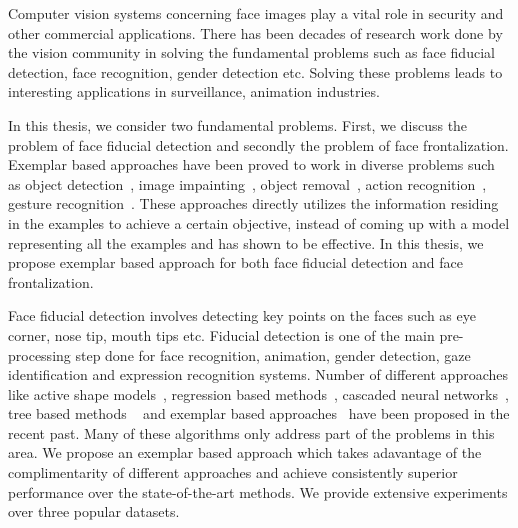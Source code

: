 

Computer vision systems concerning face images play a vital role in security and other commercial applications. 
There has been decades of research work done by the vision community in solving the fundamental problems
such as face fiducial detection, face recognition, gender detection etc. Solving these problems
leads to interesting applications in surveillance, animation industries. 

In this thesis, we consider two fundamental problems. First, we discuss the problem of face fiducial
detection and secondly the problem of face frontalization. Exemplar based approaches have been proved 
to work in diverse problems such as object detection~\cite{malisiewicz-iccv11}, image impainting~\cite{Criminisi:2004:RFO:2319036.2320602}, 
object removal~\cite{conf/cvpr/CriminisiPT03}, action 
recognition~\cite{weinland:inria-00544741}, gesture recognition~\cite{Shen:2012:DHG:2206425.2206457}. 
These approaches directly utilizes the information residing in the examples to achieve a certain 
objective, instead of coming up with a model representing all the examples and has shown to be effective. 
In this thesis, we propose exemplar based approach for both face fiducial detection and face frontalization.

Face fiducial detection involves detecting key points on the faces such as eye corner, nose tip, mouth tips
etc. Fiducial detection is one of the main pre-processing step done for face recognition, animation, 
gender detection, gaze identification and expression recognition systems.
Number of different approaches like active shape models~\cite{milborrowCVPR08_ASM}, regression based 
methods~\cite{yuECCV14_CoR}, cascaded neural networks~\cite{zhangECCV14_deepfacealign}, tree based methods
~\cite{xhuCVPR12_wild} and exemplar based approaches~\cite{kumarPAMI13_faceExem} have been proposed in the 
recent past. Many of these algorithms only address part of the problems in this area. We propose an 
exemplar based approach which takes adavantage of the complimentarity of different approaches and achieve
consistently superior performance over the state-of-the-art methods. We provide extensive experiments 
over three popular datasets.

